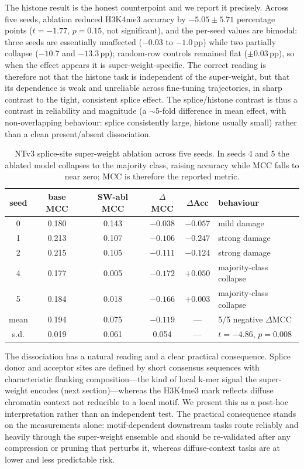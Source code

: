 \documentclass[11pt]{article}
\begin{document}
The histone result is the honest counterpoint and we report it
precisely. Across five seeds, ablation reduced H3K4me3 accuracy by
$-5.05 \pm 5.71$ percentage points ($t = -1.77$, $p = 0.15$, not
significant), and the per-seed values are bimodal: three seeds are
essentially unaffected ($-0.03$ to $-1.0$\,pp) while two partially
collapse ($-10.7$ and $-13.3$\,pp); random-row controls remained flat
($\pm 0.03$\,pp), so when the effect appears it is super-weight-specific.
The correct reading is therefore not that the histone task is
independent of the super-weight, but that its dependence is weak and
unreliable across fine-tuning trajectories, in sharp contrast to the
tight, consistent splice effect. The splice/histone contrast is thus a
contrast in reliability and magnitude (a $\sim$5-fold difference in mean
effect, with non-overlapping behaviour: splice consistently large,
histone usually small) rather than a clean present/absent dissociation.

\begin{table}[H]
\centering\small
\begin{tabular}{cccccl}
\toprule
seed & base MCC & SW-abl MCC & $\Delta$MCC & $\Delta$Acc & behaviour\\
\midrule
0 & 0.180 & 0.143 & $-0.038$ & $-0.057$ & mild damage\\
1 & 0.213 & 0.107 & $-0.106$ & $-0.247$ & strong damage\\
2 & 0.215 & 0.105 & $-0.111$ & $-0.124$ & strong damage\\
4 & 0.177 & 0.005 & $-0.172$ & $+0.050$ & majority-class collapse\\
5 & 0.184 & 0.018 & $-0.166$ & $+0.003$ & majority-class collapse\\
\midrule
mean & 0.194 & 0.075 & $-0.119$ & --- & 5/5 negative $\Delta$MCC\\
s.d. & 0.019 & 0.061 & 0.054 & --- & $t=-4.86$, $p=0.008$\\
\bottomrule
\end{tabular}
\caption{NTv3 splice-site super-weight ablation across five seeds. In
seeds 4 and 5 the ablated model collapses to the majority class, raising
accuracy while MCC falls to near zero; MCC is therefore the reported
metric.}
\label{tab:ntv3}
\end{table}

The dissociation has a natural reading and a clear practical
consequence. Splice donor and acceptor sites are defined by short
consensus sequences with characteristic flanking composition---the kind
of local k-mer signal the super-weight encodes (next section)---whereas
the H3K4me3 mark reflects diffuse chromatin context not reducible to a
local motif. We present this as a post-hoc interpretation rather than an
independent test. The practical consequence stands on the measurements
alone: motif-dependent downstream tasks route reliably and heavily
through the super-weight ensemble and should be re-validated after any
compression or pruning that perturbs it, whereas diffuse-context tasks
are at lower and less predictable risk.
\end{document}
